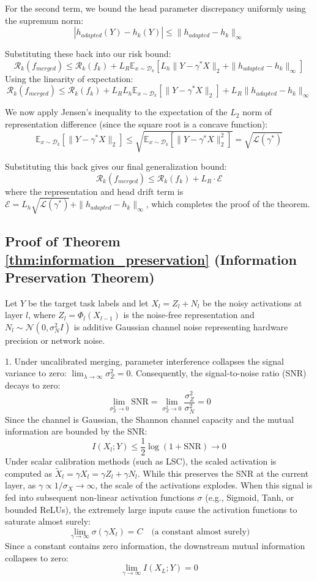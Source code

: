\documentclass{article}
\theoremstyle{plain}
\theoremstyle{definition}
\theoremstyle{remark}
\begin{document}
For the second term, we bound the head parameter discrepancy uniformly using the supremum norm:
$$\left| h_{adapted}(Y) - h_k(Y) \right| \le \| h_{adapted} - h_k \|_\infty$$

Substituting these back into our risk bound:
$$\mathcal{R}_k(f_{merged}) \le \mathcal{R}_k(f_k) + L_R \mathbb{E}_{x \sim \mathcal{D}_k} \left[ L_h \| Y - \gamma^* X \|_2 + \| h_{adapted} - h_k \|_\infty \right]$$
Using the linearity of expectation:
$$\mathcal{R}_k(f_{merged}) \le \mathcal{R}_k(f_k) + L_R L_h \mathbb{E}_{x \sim \mathcal{D}_k} \left[ \| Y - \gamma^* X \|_2 \right] + L_R \| h_{adapted} - h_k \|_\infty$$

We now apply Jensen's inequality to the expectation of the $L_2$ norm of representation difference (since the square root is a concave function):
$$\mathbb{E}_{x \sim \mathcal{D}_k} \left[ \| Y - \gamma^* X \|_2 \right] \le \sqrt{\mathbb{E}_{x \sim \mathcal{D}_k} \left[ \| Y - \gamma^* X \|_2^2 \right]} = \sqrt{\mathcal{L}(\gamma^*)}$$

Substituting this back gives our final generalization bound:
$$\mathcal{R}_k(f_{merged}) \le \mathcal{R}_k(f_k) + L_R \cdot \mathcal{E}$$
where the representation and head drift term is $\mathcal{E} = L_h \sqrt{\mathcal{L}(\gamma^*)} + \| h_{adapted} - h_k \|_\infty$, which completes the proof of the theorem.

\subsection{Proof of Theorem \ref{thm:information_preservation} (Information Preservation Theorem)}
Let $Y$ be the target task labels and let $X_l = Z_l + N_l$ be the noisy activations at layer $l$, where $Z_l = \Phi_l(X_{l-1})$ is the noise-free representation and $N_l \sim \mathcal{N}(0, \sigma_N^2 I)$ is additive Gaussian channel noise representing hardware precision or network noise.

1. Under uncalibrated merging, parameter interference collapses the signal variance to zero: $\lim_{\lambda \to \infty} \sigma_Z^2 = 0$. Consequently, the signal-to-noise ratio (SNR) decays to zero:
$$\lim_{\sigma_Z^2 \to 0} \text{SNR} = \lim_{\sigma_Z^2 \to 0} \frac{\sigma_Z^2}{\sigma_N^2} = 0$$
Since the channel is Gaussian, the Shannon channel capacity and the mutual information are bounded by the SNR:
$$I(X_l; Y) \le \frac{1}{2} \log(1 + \text{SNR}) \to 0$$
Under scalar calibration methods (such as LSC), the scaled activation is computed as $\widetilde{X}_l = \gamma X_l = \gamma Z_l + \gamma N_l$. While this preserves the SNR at the current layer, as $\gamma \propto 1/\sigma_X \to \infty$, the scale of the activations explodes.
When this signal is fed into subsequent non-linear activation functions $\sigma$ (e.g., Sigmoid, Tanh, or bounded ReLUs), the extremely large inputs cause the activation functions to saturate almost surely:
$$\lim_{\gamma \to \infty} \sigma(\gamma X_l) = C \quad \text{(a constant almost surely)}$$
Since a constant contains zero information, the downstream mutual information collapses to zero:
$$\lim_{\gamma \to \infty} I(X_L; Y) = 0$$
\end{document}
